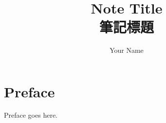 \documentclass[a4paper,oneside]{scrbook}
\author{Your Name}
\title{Note Title \\ 筆記標題}
\begin{document}
\maketitle

\chapter*{Preface}

Preface goes here.

\newpage

\tableofcontents


\newpage
\appendix
\appendixpage{}



\newpage
\pagestyle{plain}
\printbibliography{}
\end{document}

